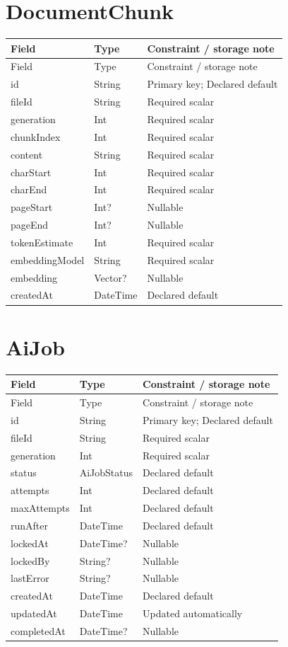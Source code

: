 \documentclass[11pt,a4paper,oneside]{report}
\begin{document}
\section{DocumentChunk}
\begin{longtable}{p{.31\linewidth}p{.23\linewidth}p{.36\linewidth}}\toprule Field&Type&Constraint / storage note\\\midrule\endfirsthead\toprule Field&Type&Constraint / storage note\\\midrule\endhead
id&String&Primary key; Declared default\\
fileId&String&Required scalar\\
generation&Int&Required scalar\\
chunkIndex&Int&Required scalar\\
content&String&Required scalar\\
charStart&Int&Required scalar\\
charEnd&Int&Required scalar\\
pageStart&Int?&Nullable\\
pageEnd&Int?&Nullable\\
tokenEstimate&Int&Required scalar\\
embeddingModel&String&Required scalar\\
embedding&Vector?&Nullable\\
createdAt&DateTime&Declared default\\
\bottomrule\end{longtable}

\section{AiJob}
\begin{longtable}{p{.31\linewidth}p{.23\linewidth}p{.36\linewidth}}\toprule Field&Type&Constraint / storage note\\\midrule\endfirsthead\toprule Field&Type&Constraint / storage note\\\midrule\endhead
id&String&Primary key; Declared default\\
fileId&String&Required scalar\\
generation&Int&Required scalar\\
status&AiJobStatus&Declared default\\
attempts&Int&Declared default\\
maxAttempts&Int&Declared default\\
runAfter&DateTime&Declared default\\
lockedAt&DateTime?&Nullable\\
lockedBy&String?&Nullable\\
lastError&String?&Nullable\\
createdAt&DateTime&Declared default\\
updatedAt&DateTime&Updated automatically\\
completedAt&DateTime?&Nullable\\
\bottomrule\end{longtable}
\end{document}

